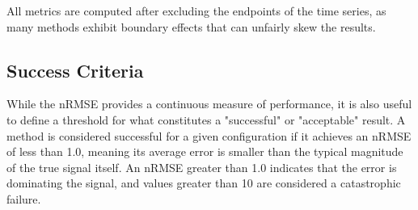 All metrics are computed after excluding the endpoints of the time series, as many methods exhibit boundary effects that can unfairly skew the results.

\subsection{Success Criteria}
\label{sec:success_criteria}

While the nRMSE provides a continuous measure of performance, it is also useful to define a threshold for what constitutes a "successful" or "acceptable" result. A method is considered successful for a given configuration if it achieves an nRMSE of less than 1.0, meaning its average error is smaller than the typical magnitude of the true signal itself. An nRMSE greater than 1.0 indicates that the error is dominating the signal, and values greater than 10 are considered a catastrophic failure.
